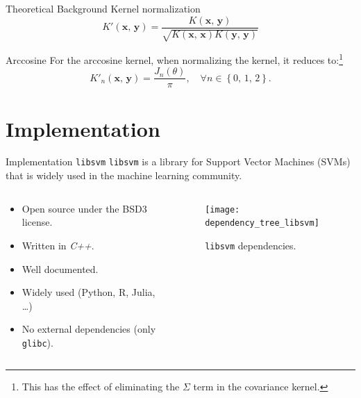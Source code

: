 \documentclass[aspectratio=169]{beamer}
\newcommand{\libsvm}{\texttt{libsvm}\xspace}
\newcommand{\y}{{\boldsymbol{y}}}
\begin{document}
\begin{frame}{Theoretical Background \textendash{} Kernel normalization}
	\begin{equation}
		K'(\boldsymbol x,\,\y) = \frac{K(\boldsymbol x,\,\y)}{\sqrt{K(\boldsymbol x,\,\boldsymbol x)K(\y,\,\y)}}
	\end{equation}
	\begin{block}{Arccosine}
		For the arccosine kernel, when normalizing the kernel, it reduces to:\footnote{This has the effect of eliminating the $\Sigma$ term in the covariance kernel.}
		\begin{equation}
			K'_n(\boldsymbol x,\,\y) = \frac{J_n(\theta)}{\pi}, \quad \forall n \in \left\{ 0,\,1,\,2 \right\}.
		\end{equation}
	\end{block}
\end{frame}

\section{Implementation}

\begin{frame}{Implementation \textendash{} \libsvm}
	\libsvm \parencite{CC01a} is a library for Support Vector Machines (SVMs) that
	is widely used in the machine learning community.
	\begin{columns}
		\begin{column}{0.6\textwidth}
			\begin{itemize}
				\item Open source under the BSD\textendash{}3 license.
				\item Written in \emph{C++}.
				\item Well documented.
				\item Widely used (Python, R, Julia, \dots)
				\item No external dependencies (only \texttt{glibc}).
			\end{itemize}
		\end{column}
		\begin{column}{0.37\textwidth}
			\begin{figure}[H]
				\texttt{[image: dependency\_tree\_libsvm]}
				\caption{\libsvm dependencies.}
			\end{figure}
		\end{column}
	\end{columns}
\end{frame}
\end{document}
